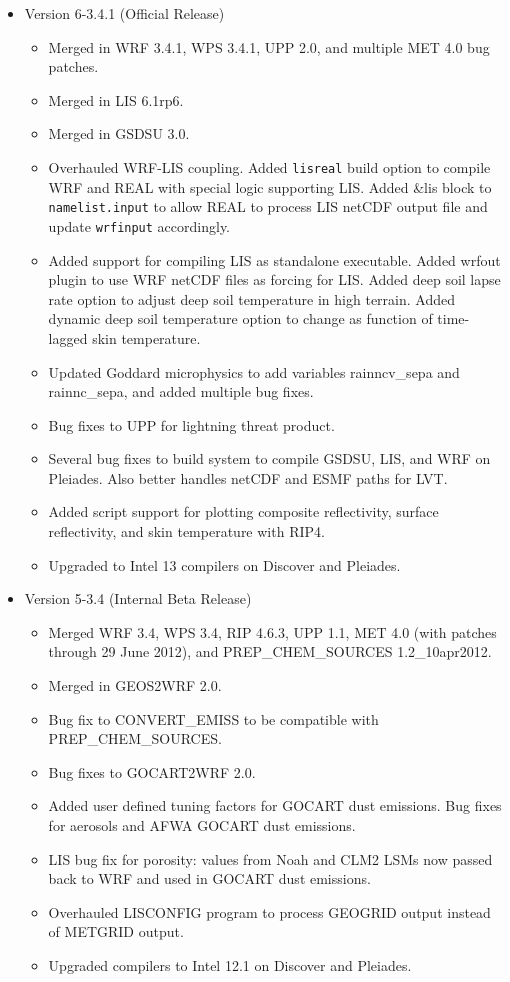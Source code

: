 \begin{itemize}
\item Version 6-3.4.1 (Official Release)
  \begin{itemize}
  \item Merged in WRF 3.4.1, WPS 3.4.1, UPP 2.0, and multiple MET 4.0 bug
    patches.
  \item Merged in LIS 6.1rp6.
  \item Merged in GSDSU 3.0.
  \item Overhauled WRF-LIS coupling. Added \texttt{lisreal} build option
    to compile WRF and REAL with special logic supporting LIS. Added
    \&lis block to \texttt{namelist.input} to allow REAL to process LIS
    netCDF output file and update \texttt{wrfinput} accordingly.
  \item Added support for compiling LIS as standalone executable. Added
    wrfout plugin to use WRF netCDF files as forcing for LIS. Added deep
    soil lapse rate option to adjust deep soil temperature in high terrain.
    Added dynamic deep soil temperature option to change as function of
    time-lagged skin temperature.
  \item Updated Goddard microphysics to add variables rainncv\_sepa and
    rainnc\_sepa, and added multiple bug fixes.
  \item Bug fixes to UPP for lightning threat product.
  \item Several bug fixes to build system to compile GSDSU, LIS, and WRF on
    Pleiades. Also better handles netCDF and ESMF paths for LVT.
  \item Added script support for plotting composite reflectivity, surface
    reflectivity, and skin temperature with RIP4.
  \item Upgraded to Intel 13 compilers on Discover and Pleiades.
  \end{itemize}

\item Version 5-3.4 (Internal Beta Release)
  \begin{itemize}
  \item Merged WRF 3.4, WPS 3.4, RIP 4.6.3, UPP 1.1, MET 4.0 (with patches
    through 29 June 2012), and PREP\_CHEM\_SOURCES 1.2\_10apr2012.
  \item Merged in GEOS2WRF 2.0.
  \item Bug fix to CONVERT\_EMISS to be compatible with PREP\_CHEM\_SOURCES.
  \item Bug fixes to GOCART2WRF 2.0.
  \item Added user defined tuning factors for GOCART dust emissions. Bug fixes
    for aerosols and AFWA GOCART dust emissions.
  \item LIS bug fix for porosity: values from Noah and CLM2 LSMs now passed
    back to WRF and used in GOCART dust emissions.
  \item Overhauled LISCONFIG program to process GEOGRID output
    instead of METGRID output.
  \item Upgraded compilers to Intel 12.1 on Discover and Pleiades.
  \end{itemize}


\end{itemize}
